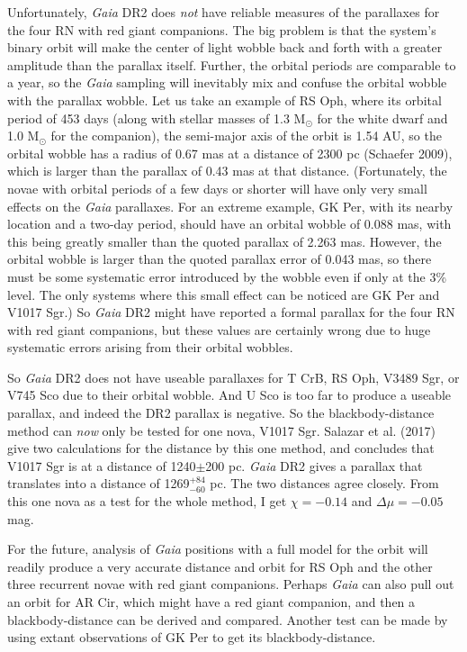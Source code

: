 \documentclass[a4paper,fleqn,usenatbib]{mnras}
\begin{document}
Unfortunately, {\it Gaia} DR2 does {\it not} have reliable measures of the parallaxes for the four RN with red giant companions.  The big problem is that the system's binary orbit will make the center of light wobble back and forth with a greater amplitude than the parallax itself.  Further, the orbital periods are comparable to a year, so the {\it Gaia} sampling will inevitably mix and confuse the orbital wobble with the parallax wobble.  Let us take an example of RS Oph, where its orbital period of 453 days (along with stellar masses of 1.3 M$_{\odot}$ for the white dwarf and 1.0 M$_{\odot}$ for the companion), the semi-major axis of the orbit is 1.54 AU, so the orbital wobble has a radius of 0.67 mas at a distance of 2300 pc (Schaefer 2009), which is larger than the parallax of 0.43 mas at that distance.  (Fortunately, the novae with orbital periods of a few days or shorter will have only very small effects on the {\it Gaia} parallaxes.  For an extreme example, GK Per, with its nearby location and a two-day period, should have an orbital wobble of 0.088 mas, with this being greatly smaller than the quoted parallax of 2.263 mas.  However, the orbital wobble is larger than the quoted parallax error of 0.043 mas, so there must be some systematic error introduced by the wobble even if only at the 3\% level.  The only systems where this small effect can be noticed are GK Per and V1017 Sgr.)  So {\it Gaia} DR2 might have reported a formal parallax for the four RN with red giant companions, but these values are certainly wrong due to huge systematic errors arising from their orbital wobbles.

So {\it Gaia} DR2 does not have useable parallaxes for T CrB, RS Oph, V3489 Sgr, or V745 Sco due to their orbital wobble.  And U Sco is too far to produce a useable parallax, and indeed the DR2 parallax is negative.  So the blackbody-distance method can {\it now} only be tested for one nova, V1017 Sgr.  Salazar et al. (2017) give two calculations for the distance by this one method, and concludes that V1017 Sgr is at a distance of 1240$\pm$200 pc.  {\it Gaia} DR2 gives a parallax that translates into a distance of 1269$_{-60}^{+84}$ pc.  The two distances agree closely.  From this one nova as a test for the whole method, I get $\chi = -0.14$ and $\Delta \mu = -0.05$ mag.

For the future, analysis of {\it Gaia} positions with a full model for the orbit will readily produce a very accurate distance and orbit for RS Oph and the other three recurrent novae with red giant companions.  Perhaps {\it Gaia} can also pull out an orbit for AR Cir, which might have a red giant companion, and then a blackbody-distance can be derived and compared.  Another test can be made by using extant observations of GK Per to get its blackbody-distance.
\end{document}
